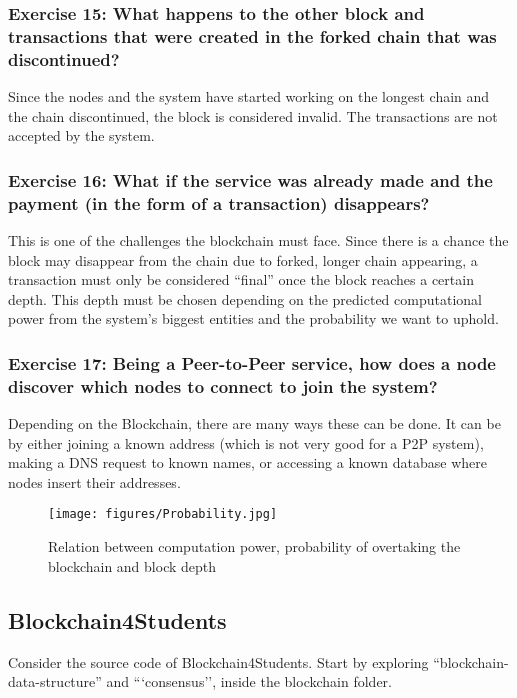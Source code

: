 \documentclass[12pt,a4paper]{article}
\begin{document}
\subsubsection*{Exercise 15: What happens to the other block and transactions that were created in the forked chain that was discontinued?}

Since the nodes and the system have started working on the longest chain and the chain discontinued, the block is considered invalid. The transactions are not accepted by the system.

\subsubsection*{Exercise 16: What if the service was already made and the payment (in the form of a transaction) disappears?}

This is one of the challenges the blockchain must face. Since there is a chance the block may disappear from the chain due to forked, longer chain appearing, a transaction must only be considered “final” once the block reaches a certain depth. This depth must be chosen depending on the predicted computational power from the system's biggest entities and the probability we want to uphold.

\subsubsection*{Exercise 17: Being a Peer-to-Peer service, how does a node discover which nodes to connect to join the system?}

Depending on the Blockchain, there are many ways these can be done. It can be by either joining a known address (which is not very good for a P2P system), making a DNS request to known names, or accessing a known database where nodes insert their addresses.

\begin{figure}[H]
\centering
\texttt{[image: figures/Probability.jpg]}
\caption{Relation between computation power, probability of overtaking the blockchain and block depth}
\label{fig:bcs}
\end{figure}


\subsection{Blockchain4Students}
Consider the source code of Blockchain4Students. Start by exploring ``blockchain-data-structure'' and ```consensus'', inside the blockchain folder.
\end{document}
